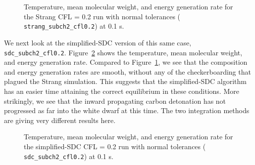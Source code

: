 \documentclass[times,preprint]{aastex631}
\newcommand{\isot}[2]{$^{#2}\mathrm{#1}$}
\newcommand{\MarginPar}[1]{\marginpar{\vskip-\baselineskip\raggedright\tiny\sffamily\hrule\smallskip{\color{red}#1}\par\smallskip\hrule}}
\begin{document}
\begin{figure}
\centering
{}
\caption{\label{fig:subch_strang_cfl02} Temperature, mean molecular weight, and
energy generation rate for the Strang CFL = 0.2 run with normal tolerances ({\tt
strang\_subch2\_cfl0.2}) at 0.1 s.}
\end{figure}

We next look at the simplified-SDC version of this same case, {\tt
sdc\_subch2\_cfl0.2}.  Figure~\ref{fig:subch_sdc_cfl02} shows the temperature,
mean molecular weight, and energy generation rate. Compared to
Figure~\ref{fig:subch_strang_cfl02}, we see that the composition and energy
generation rates are smooth, without any of the checkerboarding that plagued the
Strang simulation.  This suggests that the simplified-SDC algorithm has an
easier time attaining the correct equilibrium in these conditions. More
strikingly, we see that the inward propagating carbon detonation has not
progressed as far into the white dwarf at this time.  The two integration
methods are giving very different results here.

\begin{figure}
\centering
{}
\caption{\label{fig:subch_sdc_cfl02} Temperature, mean molecular weight, and
energy generation rate for the simplified-SDC CFL = 0.2 run with normal tolerances ({\tt
sdc\_subch2\_cfl0.2}) at 0.1 s.}
\end{figure}


\end{document}
